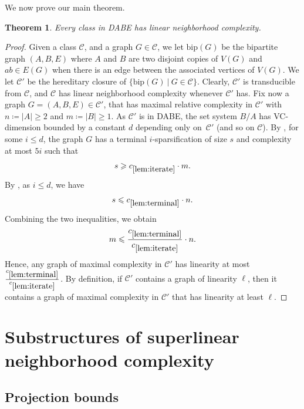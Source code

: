 \documentclass[11pt]{article}
\newtheorem{theorem}{Theorem}
\theoremstyle{definition}
\newcommand{\CC}{{\mathscr C}}
\newcommand{\inducedSS}[2]{#1/#2}%
\renewcommand{\le}{\leqslant}
\renewcommand{\ge}{\geqslant}
\begin{document}
We now prove our main theorem.

\begin{theorem}\label{thm:main}
Every class in DABE has linear neighborhood complexity.
\end{theorem}
\begin{proof}
Given a class $\CC$, and a graph $G \in \CC$, we let $\text{bip}(G)$ be the bipartite graph $(A, B, E)$ where $A$ and $B$ are two disjoint copies of $V(G)$ and $ab \in E(G)$ when there is an edge between the associated vertices of $V(G)$.
We let $\CC'$ be the hereditary closure of $\{ \text{bip} (G) ~|~ G \in \CC \}$.
Clearly, $\CC'$ is transducible from $\CC$, and $\CC$ has linear neighborhood complexity whenever $\CC'$ has.
Fix now a graph $G=(A,B,E)\in\CC'$, that has maximal relative complexity in $\CC'$ with $n\coloneqq |A| \ge 2$ and $m\coloneqq |B| \ge 1$.
As $\CC'$ is in DABE, the set system $\inducedSS{B}{A}$ has
VC-dimension bounded by a constant $d$ depending only on~$\CC'$ (and so on $\CC$).
By , for some $i\le d$, the graph $G$ has a
terminal $i$-sparsification of size $s$ and complexity at most $5i$ such
that
\[
  s\ge c_{\ref{lem:iterate}} \cdot m.
\]
By , as $i\le d$, we have
\[
  s
  \le c_{\ref{lem:terminal}} \cdot n.
\]
Combining the two inequalities, we obtain
\[
  m
  \le \frac{c_{\ref{lem:terminal}}}{c_{\ref{lem:iterate}}} \cdot n.
\]
Hence, any graph of maximal complexity in $\CC'$ has linearity at most $\frac{c_{\ref{lem:terminal}}}{c_{\ref{lem:iterate}}}$.
By definition, if $\CC'$ contains a graph of linearity $\ell$, then it contains a graph of maximal complexity in $\CC'$ that has linearity at least $\ell$.

\end{proof}

\section{Substructures of superlinear neighborhood complexity}

\subsection{Projection bounds}
\end{document}
